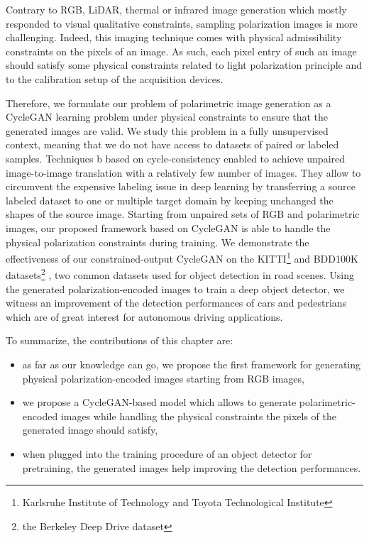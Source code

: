 Contrary to \ac{RGB}, \ac{LiDAR}, thermal or infrared image generation which mostly responded to visual qualitative  constraints, sampling polarization images is more challenging. Indeed, this imaging technique comes with physical admissibility constraints on the pixels of an image. As such, each pixel entry of such an image should satisfy some physical constraints related to light polarization principle and to the calibration setup of the acquisition devices.

Therefore, we formulate our problem of polarimetric image generation as a CycleGAN learning problem under physical constraints to ensure that the generated images are valid.  We study this problem in a fully unsupervised context, meaning that we do not have access to datasets of paired or labeled samples.  Techniques b based on cycle-consistency \citep{Zhu2017a} enabled to achieve unpaired image-to-image translation with a relatively few number of images. They allow to circumvent the expensive labeling issue in deep learning by transferring a source labeled dataset to one or multiple target domain \citep{Almahairi2018} by keeping unchanged the shapes of the source image. Starting from unpaired sets of RGB and polarimetric images, our proposed framework based on \ac{CycleGAN} \citep{Zhu2017a} is able to handle the physical polarization constraints during training. We demonstrate the effectiveness of our constrained-output CycleGAN on the KITTI\footnote{Karlsruhe Institute of Technology and Toyota Technological Institute}\citep{Geiger2012} and BDD100K datasets\footnote{the Berkeley Deep Drive dataset} \citep{Yu2020}, two common datasets used for object detection in road scenes. Using the generated polarization-encoded images to train a deep object detector, we witness an improvement of the detection performances of cars and pedestrians which are of great interest for autonomous driving applications. 

\clearpage

To summarize, the contributions of this chapter are:
\vspace{-10px}
\begin{itemize}
	\itemsep0em
	\item as far as our knowledge can go, we propose the first framework for generating physical polarization-encoded images starting from RGB images, 
	\item we propose a \ac{CycleGAN}-based model which allows to generate polarimetric-encoded images while handling the physical constraints the pixels of the generated image should satisfy,
	\item when plugged into the training procedure of an object detector for pretraining, the generated images help improving the detection performances.
\end{itemize}

